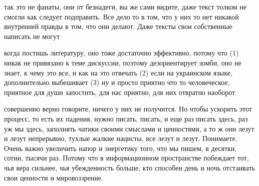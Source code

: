 так это не фанаты, они от безнадеги, вы же сами видите, даже текст толком не
смогли как следует подправить. Все дело то в том, что у них то нет никакой
внутренней правды в том, что они делают. Даже тексты свои собственные написать
не могут

когда постишь литературу, оно тоже достаточно эффективно, потому что (1) никак
не привязано к теме дискуссии, поэтому дезориентирует зомби, оно не знает, к
чему это все, и как на это отвечать (2) если на украинском языке, дополнительно
выбешивает (3) ну и просто приятно что то человеческое, приятное для души
запостить, для нас приятно, для них отвратно наоборот

совершенно верно говорите, ничего у них не получится. Но чтобы ускорить этот
процесс, то есть их падения, нужно писать, писать, и еще раз писать здесь, раз
уж мы здесь, заполнять чатики своими смыслами и ценностями, а то ж они лезут и
лезут непрерывно, тухлые жалкие нацисты, все лезут и лезут. Понимаете. Очень
важно увеличить напор и энергетику того, что мы пишем, в десятки, сотни, тысячи
раз. Потому что в информационном пространстве побеждает тот, чья вера сильнее,
чья убежденность больше, кто способен день и ночь отстаивать свои ценности и
мировоззрение.

